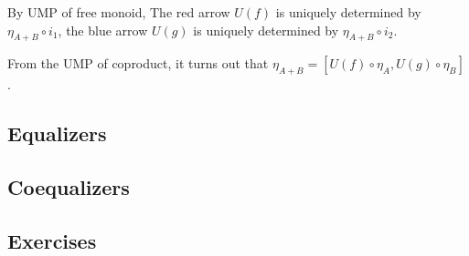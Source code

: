\documentclass[12pt, letterpaper]{article}
\newcommand{\red}[1]{{\color{red} #1}}
\newcommand{\blue}[1]{{\color{blue} #1}}
\theoremstyle{definition}
\theoremstyle{remark}
\theoremstyle{definition}
\theoremstyle{plain}
\numberwithin{equation}{section}
\begin{document}
	By UMP of free monoid, The \red{red} arrow $U(f)$ is uniquely determined by $\eta_{A+B}\circ i_1$,
		the \blue{blue} arrow $U(g)$ is uniquely determined by  $\eta_{A+B}\circ i_2$.
		
	From the UMP of coproduct, it turns out that $\eta_{A+B}=[U(f)\circ \eta_A,U(g)\circ \eta_B]$.
	
	\subsection{Equalizers}
	\subsection{Coequalizers}
	\subsection{Exercises}
\end{document}
